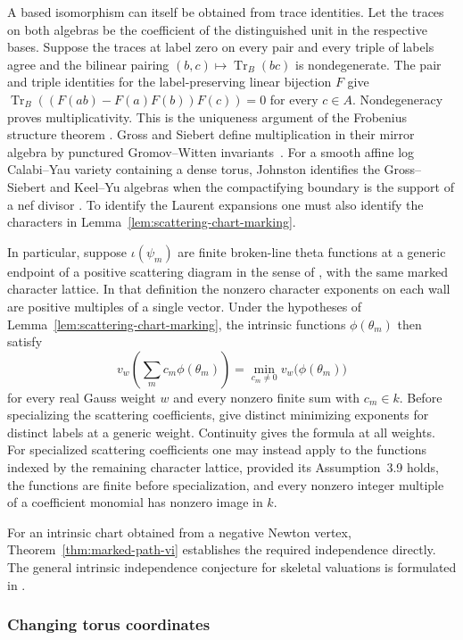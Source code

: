 \documentclass[11pt,reqno]{amsart}
\numberwithin{equation}{section}
\theoremstyle{definition}
\theoremstyle{remark}
\DeclareMathOperator{\Tr}{Tr}
\begin{document}
A based isomorphism can itself be obtained from trace identities.
Let the traces on both algebras be the coefficient of the distinguished
unit in the respective bases. Suppose the traces at label zero on every
pair and every triple of labels agree and the bilinear pairing
\((b,c)\mapsto\Tr _B(bc)\) is nondegenerate. The pair
and triple identities for the label-preserving linear bijection \(F\) give
\(\Tr _B((F(ab)-F(a)F(b))F(c))=0\) for every \(c\in A\).
Nondegeneracy proves multiplicativity.
This is the uniqueness argument of the Frobenius structure theorem
\cite[Theorem~1.2]{KY}. Gross and Siebert define multiplication in their
mirror algebra by punctured Gromov--Witten invariants~\cite{GS}.
For a smooth affine log Calabi--Yau variety containing a dense torus,
Johnston identifies the Gross--Siebert and Keel--Yu algebras when
the compactifying boundary is the support of a nef divisor
\cite[Theorem~1.1 and Corollary~1.2]{Johnston}. To identify the
Laurent expansions one must also identify the characters in
Lemma~\ref{lem:scattering-chart-marking}.

In particular, suppose \(\iota(\psi_m)\) are finite broken-line theta
functions at a generic endpoint of a positive scattering diagram in
the sense of \cite[\S2.1]{CMMM}, with the same marked character lattice.
In that definition the nonzero character exponents on each wall are
positive multiples of a single vector.
Under the hypotheses of Lemma~\ref{lem:scattering-chart-marking},
the intrinsic functions \(\phi(\theta_m)\) then satisfy
\[ v_w\!\left(\sum_m c_m\phi(\theta_m)\right) =\min_{c_m\ne0}v_w\bigl(\phi(\theta_m)\bigr) \]
for every real Gauss weight \(w\) and every nonzero finite sum with
\(c_m\in k\). Before specializing the scattering coefficients,
\cite[Theorems~3.7 and~3.8]{CMMM} give distinct minimizing exponents
for distinct labels at a generic weight. Continuity gives the formula at
all weights. For specialized scattering coefficients one may instead apply
\cite[Theorem~3.10]{CMMM} to the functions indexed by the remaining
character lattice, provided its Assumption~3.9 holds, the functions are
finite before specialization, and every nonzero integer multiple of a
coefficient monomial has nonzero image in \(k\).

For an intrinsic chart obtained from a negative Newton vertex,
Theorem~\ref{thm:marked-path-vi} establishes the required independence
directly. The general intrinsic independence conjecture for skeletal
valuations is formulated in \cite[Conjecture~21.7]{KWY}.

\subsubsection{Changing torus coordinates}
\end{document}
